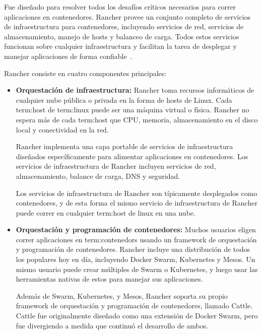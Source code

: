 Fue diseñado para resolver todos los desafíos críticos necesarios para correr
aplicaciones en contenedores. Rancher provee un conjunto completo de servicios
de infraestructura para contenedores, incluyendo servicios de red, servicios de
almacenamiento, manejo de hosts y balanceo de carga. Todos estos servicios
funcionan sobre cualquier infraestructura y facilitan la tarea de desplegar y
manejar aplicaciones de forma confiable~\cite{rancher}.

Rancher consiste en cuatro componentes principales:

\begin{itemize}

  \item \textbf{Orquestación de infraestructura:}
    Rancher toma recursos informáticos de cualquier nube pública o privada en
    la forma de hosts de Linux. Cada \gls{term:host} de \gls{term:linux} puede
    ser una máquina virtual o física. Rancher no espera más de cada
    \gls{term:host} que CPU, memoria, almacenamiento en el disco local y
    conectividad en la red.

    Rancher implementa una capa portable de servicios de infraestructura
    diseñados específicamente para alimentar aplicaciones en contenedores. Los
    servicios de infraestructura de Rancher incluyen servicios de red,
    almacenamiento, balance de carga, DNS y seguridad.

    Los servicios de infraestructura de Rancher son típicamente desplegados como
    contenedores, y de esta forma el mismo servicio de infraestructura de
    Rancher puede correr en cualquier \gls{term:host} de linux en una nube.

  \item \textbf{Orquestación y programación de contenedores:}
    Muchos usuarios eligen correr aplicaciones en \glspl{term:contenedor} usando
    un framework de orquestación y programación de contenedores. Rancher incluye
    una distribución de todos los  populares hoy en día,
    incluyendo Docker Swarm, Kubernetes y Mesos. Un mismo usuario puede crear
    múltiples  de Swarm o Kubernetes, y luego usar las
    herramientas nativas de estos  para manejar sus
    aplicaciones.

    Además de Swarm, Kubernetes, y Mesos, Rancher soporta su propio framework
    de orquestación y programación de contenedores, llamado Cattle. Cattle fue
    originalmente diseñado como una extensión de Docker Swarm, pero fue
    divergiendo a medida que continuó el desarrollo de ambos.


\end{itemize}
